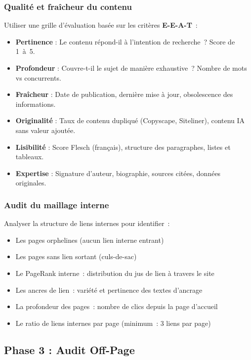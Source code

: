 \documentclass[12pt,a4paper,twoside]{report}
\newcommand{\keyword}[1]{\textbf{\textcolor{googleblue}{#1}}}
\begin{document}
\subsubsection{Qualité et fraîcheur du contenu}

Utiliser une grille d'évaluation basée sur les critères \keyword{E-E-A-T}~:
\begin{itemize}
    \item \textbf{Pertinence} : Le contenu répond-il à l'intention de recherche~? Score de 1~à~5.
    \item \textbf{Profondeur} : Couvre-t-il le sujet de manière exhaustive~? Nombre de mots vs concurrents.
    \item \textbf{Fraîcheur} : Date de publication, dernière mise à jour, obsolescence des informations.
    \item \textbf{Originalité} : Taux de contenu dupliqué (Copyscape, Siteliner), contenu IA sans valeur ajoutée.
    \item \textbf{Lisibilité} : Score Flesch (français), structure des paragraphes, listes et tableaux.
    \item \textbf{Expertise} : Signature d'auteur, biographie, sources citées, données originales.
\end{itemize}

\subsubsection{Audit du maillage interne}

Analyser la structure de liens internes pour identifier~:
\begin{itemize}
    \item Les pages orphelines (aucun lien interne entrant)
    \item Les pages sans lien sortant (culs-de-sac)
    \item Le PageRank interne~: distribution du jus de lien à travers le site
    \item Les ancres de lien~: variété et pertinence des textes d'ancrage
    \item La profondeur des pages~: nombre de clics depuis la page d'accueil
    \item Le ratio de liens internes par page (minimum~: 3 liens par page)
\end{itemize}

\subsection{Phase 3 : Audit Off-Page}
\end{document}
